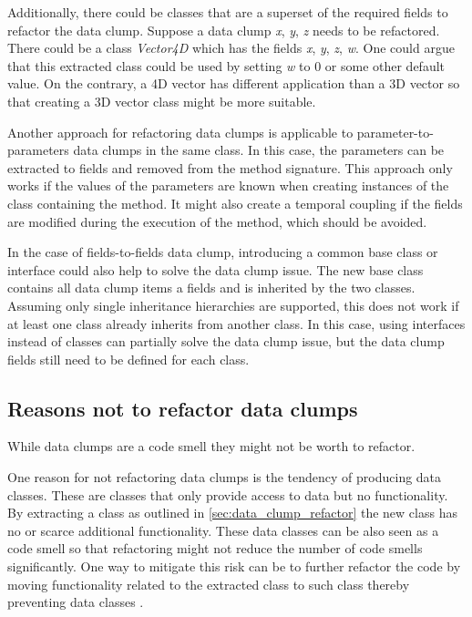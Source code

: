 Additionally, there could be classes that are a superset of the required fields to refactor the data clump. Suppose a data clump \textit{x}, \textit{y}, \textit{z} needs to be refactored. There could be a  class \textit{Vector4D} which has the fields  \textit{x}, \textit{y}, \textit{z}, \textit{w}. One could argue that this extracted class could be used by setting \textit{w} to 0 or some other default value. On the contrary, a 4D vector has different application than a 3D vector so that creating a 3D vector class might be more suitable. 

Another approach for refactoring data clumps is applicable to parameter-to-parameters data clumps in the same class. In this case, the parameters can be extracted to fields and removed from the method signature. This approach only works if the values of the parameters are known when creating instances of the class containing the method. It might also create a temporal  coupling if the fields are modified during the execution of the method, which should be avoided. 


In the case of fields-to-fields data clump, introducing a common base class or interface could also help to solve the data clump issue. The new base class contains all data clump items a fields and is inherited by the two classes. Assuming only single inheritance hierarchies are supported, this does not work if at least one class already inherits from another class. In this case, using interfaces instead of classes can partially solve the data clump issue, but the data clump fields still need to be defined for each class.





\subsection{Reasons not to refactor data clumps}\label{sec:data_clump_not_refactor}
While data clumps are a code smell they might not be worth to refactor. 

One reason for not refactoring data clumps is the tendency of producing data classes. These are classes that only provide access to data but no functionality. By extracting a class as outlined in \ref{sec:data_clump_refactor} the new class has no or scarce additional functionality. These data classes can be also seen as a code smell so that refactoring might not reduce the number of code smells significantly. One way to mitigate this risk can be to further refactor the code by moving functionality related to the extracted class to such class thereby preventing data classes \cite{fowler2019refactoring}. 

